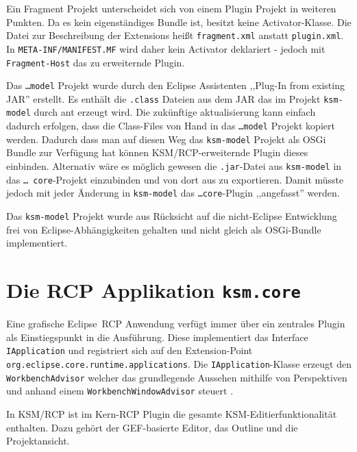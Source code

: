 \documentclass[%
12pt,titlepage,abstracton,DIV=10]{scrreprt}
\begin{document}
Ein Fragment Projekt unterscheidet sich von einem Plugin Projekt in weiteren
Punkten. Da es kein eigenständiges Bundle ist, besitzt keine Activator-Klasse.
Die Datei zur Beschreibung der Extensions heißt \texttt{fragment.xml} anstatt
\texttt{plugin.xml}. In \texttt{META-INF/MANIFEST.MF} wird daher kein Activator
deklariert - jedoch mit \texttt{Frag\-ment-Host} das zu erweiternde Plugin.

Das \texttt{\ldots model} Projekt wurde durch den Eclipse Assistenten ,,Plug-In
from existing JAR'' erstellt. Es enthält die \texttt{.class} Dateien aus dem JAR
das im Projekt \texttt{ksm-model} durch ant erzeugt wird. Die zukünftige
aktualisierung kann einfach dadurch erfolgen, dass die Class-Files von Hand in
das \texttt{\ldots model} Projekt kopiert werden. Dadurch dass man auf diesen
Weg das \texttt{ksm-model} Projekt als OSGi Bundle zur Verfügung hat können
KSM/RCP-erweiternde Plugin dieses einbinden. Alternativ wäre es möglich gewesen
die \texttt{.jar}-Datei aus \texttt{ksm-model} in das \texttt{\ldots
core}-Projekt einzubinden und von dort aus zu exportieren. Damit müsste jedoch
mit jeder Änderung in \texttt{ksm-model} das \texttt{\ldots core}-Plugin
,,angefasst'' werden.

Das \texttt{ksm-model} Projekt wurde aus Rücksicht auf die
nicht-Eclipse Entwicklung frei von Eclipse-Abhängigkeiten gehalten und nicht
gleich als OSGi-Bundle implementiert.


\section{Die RCP Applikation \texttt{ksm.\-core}}
Eine grafische Eclipse~RCP Anwendung verfügt immer über ein zentrales Plugin als
Einstiegspunkt in die Ausführung. Diese implementiert das Interface
\texttt{IApplication} und registriert sich auf den Extension-Point
\texttt{org.\-eclipse.\-core.\-runtime.\-app\-licat\-ions}. Die
\texttt{IApplication}-Klasse erzeugt den \texttt{Work\-be\-nch\-Advisor} welcher
das grundlegende Aussehen mithilfe von Perspektiven und anhand einem
\texttt{Work\-bench\-Window\-Advisor} steuert \cite{vogelrcp}.

In KSM/RCP ist im Kern-RCP Plugin die gesamte KSM-Editierfunktionalität
enthalten. Dazu gehört der GEF-basierte Editor, das Outline und die
Projektansicht.
\end{document}
